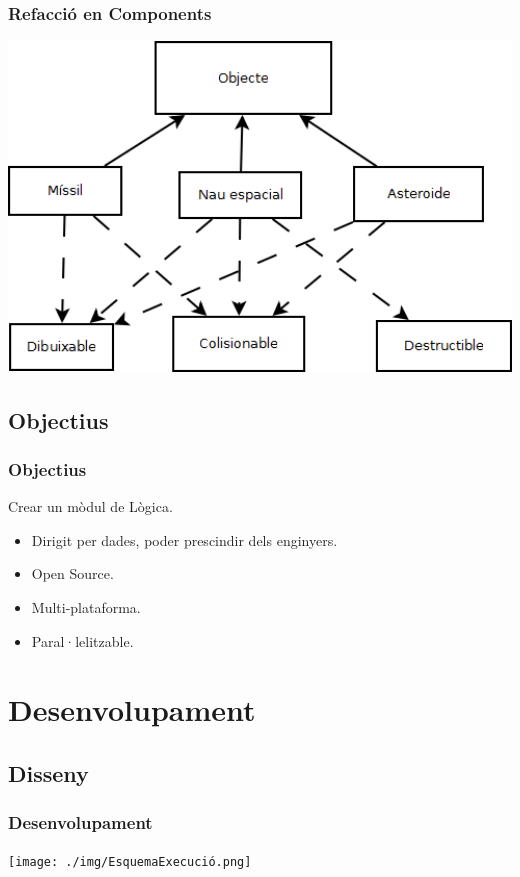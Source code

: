 \documentclass[serif,9pt]{beamer}
\begin{document}
    \begin{frame}\frametitle{Refacció en Components}
      \includegraphics[width=1.00\textwidth]{./img/DiagramaObjectes3.png}
    \end{frame}
    
  \subsection{Objectius}

    \begin{frame}\frametitle{Objectius}
      Crear un mòdul de Lògica.
      \begin{itemize}
        \item Dirigit per dades, poder prescindir dels enginyers.
        \item Open Source.
        \item Multi-plataforma.
        \item Paral·lelitzable.
      \end{itemize}
    \end{frame}

\section{Desenvolupament}

  \subsection{Disseny}
  
    \begin{frame}\frametitle{Desenvolupament}
      \texttt{[image: ./img/EsquemaExecució.png]}
    \end{frame}
\end{document}
